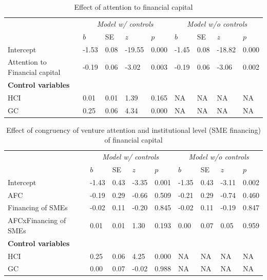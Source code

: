 \documentclass[
  english,
  man]{apa6}
\begin{document}
\begin{table}

\caption{\label{tab:unnamed-chunk-18}Effect of attention to financial capital}
\centering
\begin{tabular}[t]{l|l|l|l|l|l|l|l|l}
\hline
\multicolumn{1}{c|}{\em{ }} & \multicolumn{4}{c|}{\em{Model w/ controls}} & \multicolumn{4}{c}{\em{Model w/o controls}} \\
\cline{2-5} \cline{6-9}
  & $b$ & SE & $z$ & $p$ & $b$ & SE & $z$ & $p$\\
\hline
Intercept & -1.53 & 0.08 & -19.55 & 0.000 & -1.45 & 0.08 & -18.82 & 0.000\\
\hline
Attention to Financial capital & -0.19 & 0.06 & -3.02 & 0.003 & -0.19 & 0.06 & -3.06 & 0.002\\
\hline
\multicolumn{9}{l}{\textbf{Control variables}}\\
\hline
\hspace{1em}HCI & 0.01 & 0.01 & 1.39 & 0.165 & NA & NA & NA & NA\\
\hline
\hspace{1em}GC & 0.25 & 0.06 & 4.34 & 0.000 & NA & NA & NA & NA\\
\hline
\end{tabular}
\end{table}

\begin{table}

\caption{\label{tab:unnamed-chunk-18}Effect of congruency of venture attention and institutional level (SME financing) of financial capital}
\centering
\begin{tabular}[t]{l|l|l|l|l|l|l|l|l}
\hline
\multicolumn{1}{c|}{\em{ }} & \multicolumn{4}{c|}{\em{Model w/ controls}} & \multicolumn{4}{c}{\em{Model w/o controls}} \\
\cline{2-5} \cline{6-9}
  & $b$ & SE & $z$ & $p$ & $b$ & SE & $z$ & $p$\\
\hline
Intercept & -1.43 & 0.43 & -3.35 & 0.001 & -1.35 & 0.43 & -3.11 & 0.002\\
\hline
AFC & -0.19 & 0.29 & -0.66 & 0.509 & -0.21 & 0.29 & -0.74 & 0.460\\
\hline
Financing of SMEs & -0.02 & 0.11 & -0.20 & 0.845 & -0.02 & 0.11 & -0.19 & 0.847\\
\hline
AFCxFinancing of SMEs & 0.01 & 0.01 & 1.30 & 0.193 & 0.00 & 0.07 & 0.05 & 0.959\\
\hline
\multicolumn{9}{l}{\textbf{Control variables}}\\
\hline
\hspace{1em}HCI & 0.25 & 0.06 & 4.25 & 0.000 & NA & NA & NA & NA\\
\hline
\hspace{1em}GC & 0.00 & 0.07 & -0.02 & 0.988 & NA & NA & NA & NA\\
\hline
\end{tabular}
\end{table}
\end{document}
